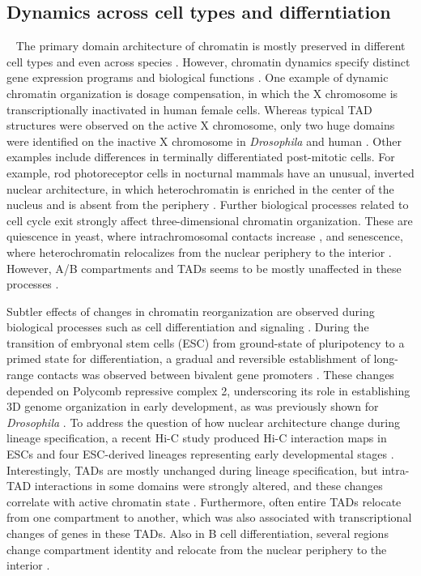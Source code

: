 \documentclass[a4paper,twoside=true,openright,parskip=full,chapterprefix=true,11pt,headings=normal,bibliography=totoc,listof=totoc,titlepage=on,captions=tableabove,draft=false]{scrreprt}
\theoremstyle{definition}
\theoremstyle{definition}
\theoremstyle{definition}
\theoremstyle{remark}
\begin{document}
\hypertarget{dynamics-across-cell-types-and-differntiation}{%
\subsection{Dynamics across cell types and
differntiation}\label{dynamics-across-cell-types-and-differntiation}}

~ The primary domain architecture of chromatin is mostly preserved in
different cell types and even across species \citep{Dixon2012, Rao2014}.
However, chromatin dynamics specify distinct gene expression programs
and biological functions \citep{Bonev2016}. One example of dynamic
chromatin organization is dosage compensation, in which the X chromosome
is transcriptionally inactivated in human female cells. Whereas typical
TAD structures were observed on the active X chromosome, only two huge
domains were identified on the inactive X chromosome in
\emph{Drosophila} and human \citep{Deng2015, Rao2014}. Other examples
include differences in terminally differentiated post-mitotic cells. For
example, rod photoreceptor cells in nocturnal mammals have an unusual,
inverted nuclear architecture, in which heterochromatin is enriched in
the center of the nucleus and is absent from the periphery
\citep{Solovei2013, Falk2018}. Further biological processes related to
cell cycle exit strongly affect three-dimensional chromatin
organization. These are quiescence in yeast, where intrachromosomal
contacts increase \citep{Rutledge2015}, and senescence, where
heterochromatin relocalizes from the nuclear periphery to the interior
\citep{Chandra2015}. However, A/B compartments and TADs seems to be
mostly unaffected in these processes \citep{Criscione2016}.

Subtler effects of changes in chromatin reorganization are observed
during biological processes such as cell differentiation and signaling
\citep{Bonev2016}. During the transition of embryonal stem cells (ESC)
from ground-state of pluripotency to a primed state for differentiation,
a gradual and reversible establishment of long-range contacts was
observed between bivalent gene promoters \citep{Joshi2015}. These
changes depended on Polycomb repressive complex 2, underscoring its role
in establishing 3D genome organization in early development, as was
previously shown for \emph{Drosophila} \citep{Bantignies2011}. To
address the question of how nuclear architecture change during lineage
specification, a recent Hi-C study produced Hi-C interaction maps in
ESCs and four ESC-derived lineages representing early developmental
stages \citep{Dixon2015}. Interestingly, TADs are mostly unchanged
during lineage specification, but intra-TAD interactions in some domains
were strongly altered, and these changes correlate with active chromatin
state \citep{Dixon2015}. Furthermore, often entire TADs relocate from
one compartment to another, which was also associated with
transcriptional changes of genes in these TADs. Also in B cell
differentiation, several regions change compartment identity and
relocate from the nuclear periphery to the interior \citep{Lin2012}.
\end{document}
